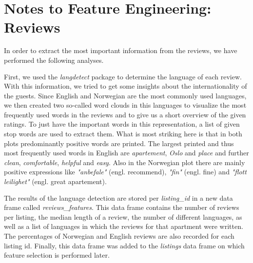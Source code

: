 \documentclass[12pt, letterpaper]{article}
\begin{document}
\section*{Notes to Feature Engineering: Reviews}


In order to extract the most important information from the reviews, we have performed the following analyses.

First, we used the \textit{langdetect} package to determine the language of each review. 
With this information, we tried to get some insights about the internationality of the guests. 
Since English and Norwegian are the most commonly used languages, we then created two so-called word clouds in this languages 
to visualize the most frequently used words in the reviews and to give us a short overview of the given ratings.
To just have the important words in this representation, a list of given stop words are used to extract them. What is most striking here is that in both plots predominantly positive words are printed. The largest printed and thus most frequently used words in English are \textit{apartement}, \textit{Oslo} and \textit{place} and 
further \textit{clean}, \textit{comfortable}, \textit{helpful} and \textit{easy}. Also in the Norwegian plot there are mainly positive expressions like \textit{"anbefale"} (engl. recommend), \textit{"fin"} (engl. fine) and \textit{"flott leilighet"} (engl. great apartement).


The results of the language detection are stored per \textit{listing\_id} in a new data frame called \textit{reviews\_features}. 
This data frame contains the number of reviews per listing, the median length of a review, the number of different languages, 
as well as a list of languages in which the reviews for that apartment were written. The percentages of Norwegian and English reviews are 
also recorded for each listing id. Finally, this data frame was added to the \textit{listings} data frame on which feature selection 
is performed later.
\end{document}
